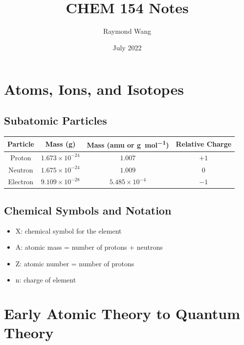 \documentclass{article}
\title{CHEM 154 Notes}
\author{Raymond Wang}
\date{July 2022}
\begin{document}

\maketitle

\tableofcontents

\section{Atoms, Ions, and Isotopes}

\subsection{Subatomic Particles}

\begin{center}
    \begin{tabular}{|c|c|c|c|}
        \hline
        \textbf{Particle} & \textbf{Mass (\si{\gram})} & \textbf{Mass (amu or \si{\gram\per\mol})} & \textbf{Relative Charge} \\ 
        \hline
        Proton & $1.673 \times 10^{-24}$ & $1.007$ & $+1$ \\  
        Neutron & $1.675 \times 10^{-24}$ & $1.009$ & $0$ \\
        Electron & $9.109 \times 10^{-28}$ & $5.485 \times 10^{-4}$ & $-1$ \\
        \hline 
    \end{tabular}
\end{center}

\subsection{Chemical Symbols and Notation}

\begin{center}
\end{center}

\begin{itemize}
    \item X: chemical symbol for the element
    \item A: atomic mass = number of protons + neutrons
    \item Z: atomic number = number of protons
    \item n: charge of element
\end{itemize}

\section{Early Atomic Theory to Quantum Theory}
\end{document}
